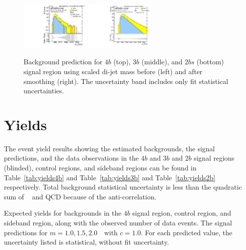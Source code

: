 \begin{figure}[htbp!]
\begin{center}
\includegraphics[width=0.3\textwidth,angle=-90]{figures/boosted/Signal/b77_TwoTag_split_Signal_mHH_pole_1_blind.pdf}
\includegraphics[width=0.3\textwidth,angle=-90]{figures/boosted/Smooth/Moriond_bkg_9_TwoTag_split_pole_Signal_mHH_pole_1_blind.pdf}
\end{center}
\caption{Background prediction for $4b$ (top), $3b$ (middle), and $2bs$ (bottom) signal region using scaled di-jet mass before (left) and after smoothing (right). The uncertainty band includes only fit statistical uncertainties.}
\label{fig:signal-region-mjjscaled-smooth-bkg-noSYS}
\end{figure}

\section{Yields}
\label{sec:yields}
\paragraph{}
The event yield results showing the estimated backgrounds, the signal predictions, and the data observations in the $4b$ and $3b$ and $2b$ signal regions (blinded), control regions, and sideband regions can be found in Table~\ref{tab:yields4b} and Table~\ref{tab:yields3b} and Table~\ref{tab:yields2b} respectively. Total background statistical uncertainty is less than the quadratic sum of \ttbar~ and QCD because of the anti-correlation.

\begin{table}[htbp!]
\footnotesize
\begin{center}
\caption{Expected yields for backgrounds in the $4b$ signal region, control region, and sideband region, along with the observed number of data events.  The signal predictions for \Grav $m=1.0, 1.5, 2.0$~\TeV\ with $c=1.0$.  For each predicted value, the uncertainty listed is statistical, without fit uncertainty.}

\label{tab:yields4b}
\end{center}
\end{table}


